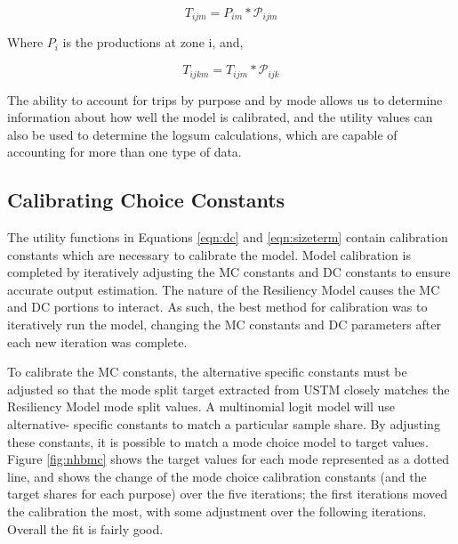 \begin{equation}
	T_{ijm} = P_{im} * \mathcal{P}_{ijm}
	\label{eqn:ij}
\end{equation}

\noindent Where $P_i$ is the productions at zone i, and,

\begin{equation}
	T_{ijkm} = T_{ijm} * \mathcal{P}_{ijk}
	\label{eqn:ijk}
\end{equation}

\noindent The ability to account for trips by purpose and by mode allows us to
determine information about how well the model is calibrated, and the utility
values can also be used to determine the logsum calculations, which are capable
of accounting for more than one type of data.


\subsection{Calibrating Choice Constants}

The utility functions in Equations \ref{eqn:dc} and \ref{eqn:sizeterm} contain
calibration constants which are necessary to calibrate the model. Model
calibration is completed by iteratively adjusting the MC
constants and DC constants to ensure accurate output estimation. The nature
of the Resiliency Model causes the MC and DC portions to interact. As such,
the best method for calibration was to iteratively run the model, changing
the MC constants and DC parameters after each new iteration was complete.

To calibrate the MC constants, the alternative specific constants must be
adjusted so that the mode split target extracted from USTM closely matches the
Resiliency Model mode split values. A multinomial logit model will use alternative-
specific constants to match a particular sample share. By adjusting these
constants, it is possible to match a mode choice model to target values.
Figure \ref{fig:nhbmc} shows the target values for each mode represented as a dotted line, and shows the change of the mode choice calibration constants
(and the target shares for each purpose) over the five iterations;
the first iterations moved the calibration the most, with some adjustment
over the following iterations. Overall the fit is fairly good.

